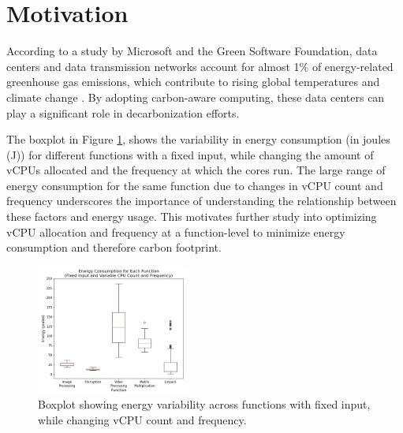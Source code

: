 \documentclass[times, 10pt,twocolumn]{article}
\begin{document}
\section{Motivation}

According to a study by Microsoft and the Green Software Foundation, data centers and data transmission networks account for almost 1\% of energy-related greenhouse gas emissions, which contribute to rising global temperatures and climate change \cite{carbon_aware_computing}. By adopting carbon-aware computing, these data centers can play a significant role in decarbonization efforts. 



The boxplot in Figure \ref{fig:energy_boxplot}, 
shows the variability in energy consumption (in joules (J)) for different functions with a fixed input, while changing the amount of vCPUs allocated and the frequency at which the cores run. The large range of energy consumption for the same function due to changes in vCPU count and frequency underscores the importance of understanding the relationship between these factors and energy usage. This motivates further study into optimizing vCPU allocation and frequency at a function-level to minimize energy consumption and therefore carbon footprint. 


\begin{figure}[ht]
   \centering
   \includegraphics[width=0.45\textwidth]{imgs/energy_boxplot.png}
   \caption{Boxplot showing energy variability across functions with fixed input, while changing vCPU count and frequency. }
   \label{fig:energy_boxplot}
 \end{figure}
\end{document}
